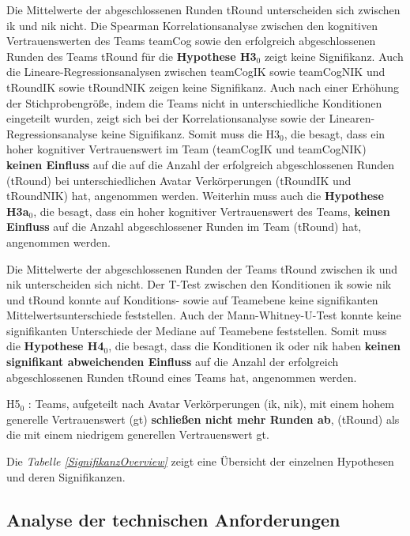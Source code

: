 \documentclass[a4paper,11pt]{article}%
\renewcommand{\\}{\vspace*{0.5\baselineskip} \newline}
\begin{document}
Die Mittelwerte der abgeschlossenen Runden \ac{tRound} unterscheiden sich zwischen \ac{ik} und \ac{nik} nicht.
Die Spearman Korrelationsanalyse zwischen den kognitiven Vertrauenswerten des Teams \ac{teamCog} sowie den erfolgreich abgeschlossenen Runden des Teams \ac{tRound} für die \textbf{Hypothese H3$_{0}$} zeigt keine Signifikanz.
Auch die Lineare-Regressionsanalysen zwischen \ac{teamCogIK} sowie \ac{teamCogNIK} und \ac{tRoundIK} sowie \ac{tRoundNIK} zeigen keine Signifikanz. Auch nach einer Erhöhung der Stichprobengröße, indem die Teams nicht in unterschiedliche Konditionen eingeteilt wurden, zeigt sich bei der Korrelationsanalyse sowie der Linearen-Regressionsanalyse keine Signifikanz. Somit muss die H3$_{0}$, die besagt, dass ein hoher kognitiver Vertrauenswert im Team (\ac{teamCogIK} und \ac{teamCogNIK})  \textbf{keinen Einfluss} auf die auf die Anzahl der erfolgreich abgeschlossenen Runden (\ac{tRound}) bei unterschiedlichen Avatar Verkörperungen (\ac{tRoundIK} und \ac{tRoundNIK}) hat, angenommen werden.
Weiterhin muss auch die \textbf{Hypothese H3a$_{0}$}, die besagt, dass ein hoher kognitiver Vertrauenswert des Teams, \textbf{keinen Einfluss} auf die Anzahl abgeschlossener Runden im Team (\ac{tRound}) hat, angenommen werden.

Die Mittelwerte der abgeschlossenen Runden der Teams \ac{tRound} zwischen \ac{ik} und \ac{nik} unterscheiden sich nicht. Der T-Test zwischen den Konditionen \ac{ik} sowie \ac{nik} und \ac{tRound} konnte auf Konditions- sowie auf Teamebene keine signifikanten Mittelwertsunterschiede feststellen. Auch der Mann-Whitney-U-Test konnte keine signifikanten Unterschiede der Mediane auf Teamebene feststellen. Somit muss die \textbf{Hypothese H4$_{0}$}, die besagt, dass die Konditionen \ac{ik} oder \ac{nik} haben \textbf{keinen signifikant abweichenden Einfluss} auf die Anzahl der erfolgreich abgeschlossenen Runden \ac{tRound} eines Teams hat, angenommen werden.


H5$_{0}$ : Teams, aufgeteilt nach Avatar Verkörperungen (\ac{ik}, \ac{nik}), mit einem hohem generelle Vertrauenswert (\ac{gt}) \textbf{schließen nicht mehr Runden ab}, (\ac{tRound}) als die mit einem niedrigem generellen Vertrauenswert \ac{gt}.

Die \textit{Tabelle \ref{SignifikanzOverview} } zeigt eine Übersicht der einzelnen Hypothesen und deren Signifikanzen.
\subsection{Analyse der technischen Anforderungen}
\end{document}
